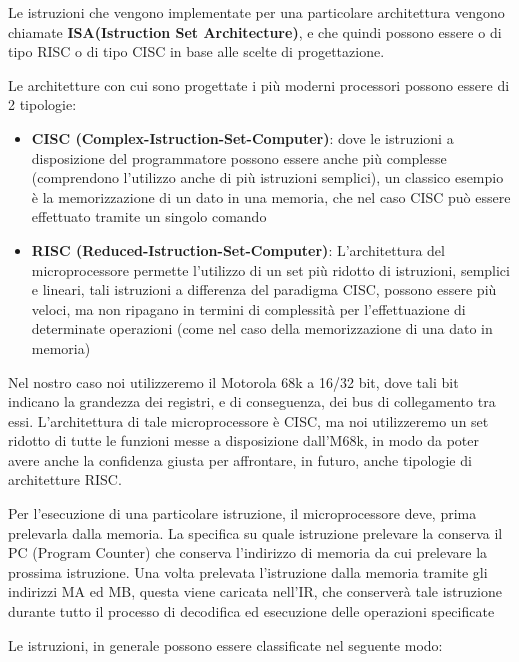 Le istruzioni che vengono implementate per una particolare architettura vengono chiamate \textbf{ISA(Istruction Set Architecture)}, e che quindi possono essere o di tipo RISC o di tipo CISC in base alle scelte di progettazione.

Le architetture con cui sono progettate i più moderni processori possono essere di 2 tipologie:
\begin{itemize}
    \item \textbf{CISC (Complex-Istruction-Set-Computer)}: dove le istruzioni a disposizione del programmatore possono essere anche più complesse (comprendono l'utilizzo anche di più istruzioni semplici), un classico esempio è la memorizzazione di un dato in una memoria, che nel caso CISC può essere effettuato tramite un singolo comando

    \item \textbf{RISC (Reduced-Istruction-Set-Computer)}: L'architettura del microprocessore permette l'utilizzo di un set più ridotto di istruzioni, semplici e lineari, tali istruzioni a differenza del paradigma CISC, possono essere più veloci, ma non ripagano in termini di complessità per l'effettuazione di determinate operazioni (come nel caso della memorizzazione di una dato in memoria)
\end{itemize}

Nel nostro caso noi utilizzeremo il Motorola 68k a 16/32 bit, dove tali bit indicano la grandezza dei registri, e di conseguenza, dei bus di collegamento tra essi. L'architettura di tale microprocessore è CISC, ma noi utilizzeremo un set ridotto di tutte le funzioni messe a disposizione dall'M68k, in modo da poter avere anche la confidenza giusta per affrontare, in futuro, anche tipologie di architetture RISC.

Per l'esecuzione di una particolare istruzione, il microprocessore deve, prima prelevarla dalla memoria. La specifica su quale istruzione prelevare la conserva il PC (Program Counter) che conserva l'indirizzo di memoria da cui prelevare la prossima istruzione. Una volta prelevata l'istruzione dalla memoria tramite gli indirizzi MA ed MB, questa viene caricata nell'IR, che conserverà tale istruzione durante tutto il processo di decodifica ed esecuzione delle operazioni specificate

Le istruzioni, in generale possono essere classificate nel seguente modo:

